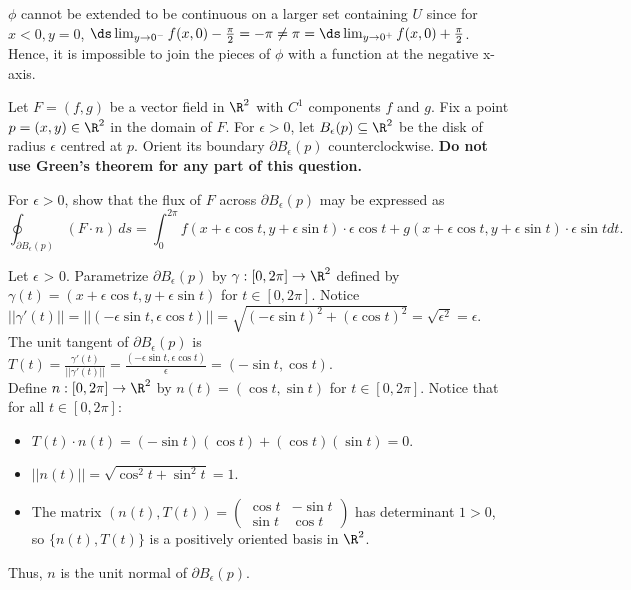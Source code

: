 \documentclass{exam}
\begin{document}
\begin{questions}
\begin{parts}
\begin{answer}{500pt}
$\phi$ cannot be extended to be continuous on a larger set containing $U$ since for $x<0,y=0$, $\ds \lim_{y \to 0^-} f(x,0)-\frac{\pi}{2} = -\pi \neq \pi = \ds \lim_{y \to 0^+} f(x,0)+\frac{\pi}{2}$. Hence, it is impossible to join the pieces of $\phi$ with a function at the negative x-axis.
\end{answer}

\end{parts}
 


\pagebreak
\question  Let $F = (f,g)$ be a vector field in $\R^2$ with $C^1$ components $f$ and $g$. Fix a point $p = (x,y) \in \R^2$ in the domain of $F$. For $\epsilon > 0$, let $B_{\epsilon}(p) \subseteq \R^2$ be the disk of radius $\epsilon$ centred at $p$. Orient its boundary $\partial B_{\epsilon}(p)$ counterclockwise.  \textbf{Do not use Green's theorem for any part of this question.} 

\begin{parts}	

\item \label{Setup} For $\epsilon > 0$, show that the flux of $F$ across $\partial B_{\epsilon}(p)$ may be expressed as
\[
\oint_{\partial B_{\epsilon}(p)} (F \cdot n) \,  ds = \int_{0}^{2\pi} f(x+\epsilon \cos t, y + \epsilon \sin t) \cdot \epsilon \cos t + g(x+ \epsilon \cos t, y + \epsilon \sin t) \cdot \epsilon \sin t dt.
\]

\begin{answer}{520pt}
Let $\epsilon$ > 0. Parametrize $\partial B_{\epsilon}(p)$ by $\gamma: [0,2\pi] \to \R^2$ defined by $\gamma(t) = (x+\epsilon\cos t, y+\epsilon\sin t)$ for $t \in [0,2\pi]$. Notice $||\gamma'(t)|| = ||(-\epsilon\sin t, \epsilon\cos t)|| = \sqrt{(-\epsilon\sin t)^2 + (\epsilon\cos t)^2} = \sqrt{\epsilon^2} = \epsilon$.\\

The unit tangent of $\partial B_{\epsilon}(p)$ is $T(t) = \frac{\gamma'(t)}{||\gamma'(t)||} = \frac{(-\epsilon\sin t, \epsilon\cos t)}{\epsilon} = (-\sin t, \cos t)$.\\

Define $n: [0,2\pi] \to \R^2$ by $n(t) = (\cos t, \sin t)$ for $t \in [0,2\pi]$. Notice that for all $t \in [0,2\pi]$:\begin{itemize}
  \item $T(t) \cdot n(t) = (-\sin t)(\cos t) + (\cos t)(\sin t) = 0$.
  \item $||n(t)|| = \sqrt{\cos^2 t + \sin^2 t} = 1$.
  \item The matrix $(n(t), T(t)) = \begin{pmatrix}
  \cos t & -\sin t \\
  \sin t & \cos t
  \end{pmatrix}$ has determinant $1 > 0$, so $\{n(t), T(t)\}$ is a positively oriented basis in $\R^2$.
\end{itemize}
Thus, $n$ is the unit normal of $\partial B_{\epsilon}(p)$.\\


\end{answer}
\end{parts}
\end{questions}
\end{document}
